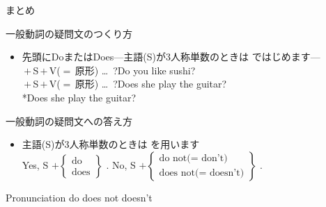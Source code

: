 \documentclass[aspectratio=169]{beamer}
\begin{document}
\begin{frame}[plain]{まとめ}
 

\begin{exampleblock}{一般動詞の疑問文のつくり方}\small
\begin{itemize}
 \item   先頭にDoまたはDoes\hspace{10pt}---主語(S)が3人称単数のときは\,\,ではじめます---\\
	 \,$+$\,S\,$+$\,V{\scriptsize ($=$\,原形)} \ldots\,\,\,?\hfill{}Do you like sushi?\\
	 \,$+$\,S\,$+$\,V{\scriptsize ($=$\,原形)} \ldots\,\,\,?\hfill{}Does she play the guitar?\\
\hfill{}*Does she play the guitar?
\end{itemize}
     \end{exampleblock}

\begin{exampleblock}{一般動詞の疑問文への答え方}
\small

\begin{itemize}
 \item 主語(S)が3人称単数のときは\,\,を用います\\
Yes, S $+ \left\{\begin{array}{l}
		  \text{do}\\
		\text{does}\end{array}\right\}$\,\,.
\hspace{20pt}
No, S $+ \left\{\begin{array}{l}
		  \text{do not($=$ don't)}\\
		\text{does not($=$ doesn't)}\end{array}\right\}$\,\,.
\end{itemize}
      \end{exampleblock}

\begin{exampleblock}{Pronunciation}
 do \hspace{15pt}does \hspace{15pt}not \hspace{15pt}doesn't 
\end{exampleblock}

\end{frame}
\end{document}
